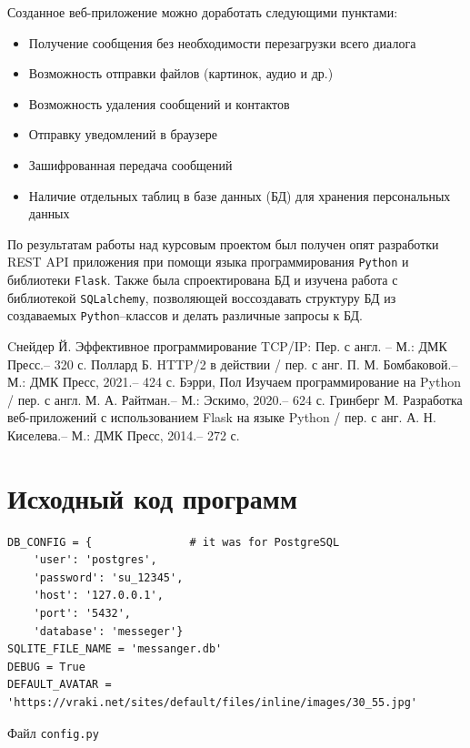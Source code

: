\documentclass[14pt,final]{report}
\begin{document}
Созданное веб-приложение можно доработать следующими пунктами:
\begin{itemize}
    \item Получение сообщения без необходимости перезагрузки всего диалога
    \item Возможность отправки файлов (картинок, аудио и др.)
    \item Возможность удаления сообщений и контактов
    \item Отправку уведомлений в браузере
    \item Зашифрованная передача сообщений
    \item Наличие отдельных таблиц в базе данных (БД) для хранения персональных данных
\end{itemize}

По результатам работы над курсовым проектом был получен опят разработки REST API приложения при помощи языка программирования \texttt{Python} и библиотеки \texttt{Flask}. Также была спроектирована БД и изучена работа с библиотекой \texttt{SQLalchemy}, позволяющей воссоздавать структуру БД из создаваемых \texttt{Python}--классов и делать различные запросы к БД.

\begin{thebibliography}{99}
 Cнейдер Й. Эффективное программирование TCP/IP: Пер. с англ. -- М.: ДМК Пресс.-- 320 с.
 Поллард Б. HTTP/2 в действии / пер. с анг. П. М. Бомбаковой.-- М.: ДМК Пресс, 2021.-- 424 с.
 Бэрри, Пол Изучаем программирование на Python / пер. с англ. М. А. Райтман.-- М.: Эскимо, 2020.-- 624 с.
 Гринберг М. Разработка веб-приложений с использованием Flask на языке Python / пер. с анг. А. Н. Киселева.-- М.: ДМК Пресс, 2014.-- 272 с.
\end{thebibliography}

\appendices

\chapter{Исходный код программ}

\begin{listing}[htbp]
\begin{center}
{\footnotesize
\begin{verbatim}
DB_CONFIG = {               # it was for PostgreSQL 
    'user': 'postgres',
    'password': 'su_12345',
    'host': '127.0.0.1',
    'port': '5432',
    'database': 'messeger'}
SQLITE_FILE_NAME = 'messanger.db'
DEBUG = True
DEFAULT_AVATAR = 'https://vraki.net/sites/default/files/inline/images/30_55.jpg'
\end{verbatim}}
\end{center}
\caption{Файл \texttt{config.py}}\label{lst:config}
\end{listing}
\end{document}
